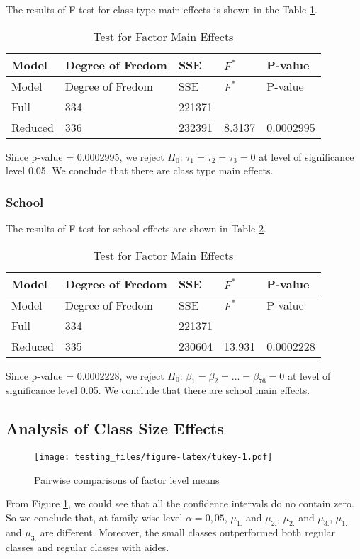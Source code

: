 \documentclass[]{article}
\begin{document}
The results of F-test for class type main effects is shown in the Table \ref{tab:class}.

\begin{longtable}[]{@{}lllll@{}}
\caption{\label{tab:class}Test for Factor Main Effects}\tabularnewline
\toprule
Model & Degree of Fredom & SSE & \(F^*\) & P-value\tabularnewline
\midrule
\endfirsthead
\toprule
Model & Degree of Fredom & SSE & \(F^*\) & P-value\tabularnewline
\midrule
\endhead
Full & 334 & 221371 & &\tabularnewline
Reduced & 336 & 232391 & 8.3137 & 0.0002995\tabularnewline
\bottomrule
\end{longtable}

Since p-value = 0.0002995, we reject \(H_0\): \(\tau_1 = \tau_2 = \tau_3 = 0\) at level of significance level 0.05. We conclude that there are class type main effects.

\hypertarget{school-1}{%
\subsubsection{School}\label{school-1}}

The results of F-test for school effects are shown in Table \ref{tab:school}.

\begin{longtable}[]{@{}lllll@{}}
\caption{\label{tab:school}Test for Factor Main Effects}\tabularnewline
\toprule
Model & Degree of Fredom & SSE & \(F^*\) & P-value\tabularnewline
\midrule
\endfirsthead
\toprule
Model & Degree of Fredom & SSE & \(F^*\) & P-value\tabularnewline
\midrule
\endhead
Full & 334 & 221371 & &\tabularnewline
Reduced & 335 & 230604 & 13.931 & 0.0002228\tabularnewline
\bottomrule
\end{longtable}

Since p-value = 0.0002228, we reject \(H_0\): \(\beta_1 = \beta_2 =...= \beta_{76} = 0\) at level of significance level 0.05. We conclude that there are school main effects.

\hypertarget{analysis-of-class-size-effects-1}{%
\subsection{Analysis of Class Size Effects}\label{analysis-of-class-size-effects-1}}

\begin{figure}
\centering
\texttt{[image: testing\_files/figure-latex/tukey-1.pdf]}
\caption{\label{fig:tukey}Pairwise comparisons of factor level means}
\end{figure}

From Figure \ref{fig:tukey}, we could see that all the confidence intervals do no contain zero. So we conclude that, at family-wise level \(\alpha = 0,05\), \(\mu_{1.}\) and \(\mu_{2.}\), \(\mu_{2.}\) and \(\mu_{3.}\), \(\mu_{1.}\) and \(\mu_{3.}\) are different. Moreover, the small classes outperformed both regular classes and regular classes with aides.
\end{document}
